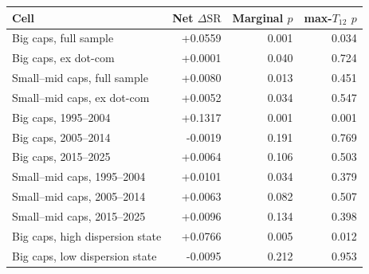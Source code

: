 \begin{tabular}{lrrr}
\toprule
Cell & Net $\Delta\mathrm{SR}$ & Marginal $p$ & max-$T_{12}$ $p$ \\
\midrule
Big caps, full sample & +0.0559 & 0.001 & 0.034 \\
Big caps, ex dot-com & +0.0001 & 0.040 & 0.724 \\
Small--mid caps, full sample & +0.0080 & 0.013 & 0.451 \\
Small--mid caps, ex dot-com & +0.0052 & 0.034 & 0.547 \\
Big caps, 1995--2004 & +0.1317 & 0.001 & 0.001 \\
Big caps, 2005--2014 & -0.0019 & 0.191 & 0.769 \\
Big caps, 2015--2025 & +0.0064 & 0.106 & 0.503 \\
Small--mid caps, 1995--2004 & +0.0101 & 0.034 & 0.379 \\
Small--mid caps, 2005--2014 & +0.0063 & 0.082 & 0.507 \\
Small--mid caps, 2015--2025 & +0.0096 & 0.134 & 0.398 \\
Big caps, high dispersion state & +0.0766 & 0.005 & 0.012 \\
Big caps, low dispersion state & -0.0095 & 0.212 & 0.953 \\
\bottomrule
\end{tabular}

